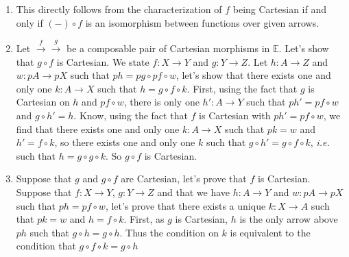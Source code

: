 \documentclass{report}
\newcommand{\bE}[0]{\mathbb E}
\newcommand{\bB}[0]{\mathbb B}
\begin{document}
\begin{answer}
    \begin{enumerate}[label=(\roman*)]
        \item This directly follows from the characterization of $f$ being Cartesian if and only if $(-)\circ
        f$ is an isomorphism between functions over given arrows.
        \item Let $\xrightarrow f \xrightarrow g$ be a composable pair of Cartesian morphisms in $\bE$.
        Let's show that $g\circ f$ is Cartesian. We state $f : X \to Y$ and $g : Y \to Z$. Let
        $h : A \to Z$ and $w : pA \to pX$ such that $ph = pg\circ pf \circ w$, let's show that there exists
        one and only one $k : A \to X$ such that $h = g \circ f \circ k$. First, using the fact that $g$ is
        Cartesian on $h$ and $pf\circ w$, there is only one $h' : A \to Y$ such that $ph' = pf \circ w$ and
        $g\circ h' = h$. Know, using the fact that $f$ is Cartesian with $ph' = pf\circ w$, we find that there
        exists one and only one $k : A \to X$ such that $pk = w$ and $h' = f\circ k$, so there exists one and
        only one $k$ such that $g\circ h' = g\circ f \circ k$, \textit{i.e.} such that $h = g\circ g \circ k$.
        So $g\circ f$ is Cartesian.
        \begin{center}
        \end{center}
        \item Suppose that $g$ and $g\circ f$ are Cartesian, let's prove that $f$ is Cartesian. Suppose that
        $f : X \to Y$, $g : Y \to Z$ and that we have $h : A \to Y$ and $w : pA \to pX$ such that
        $ph = pf \circ w$, let's prove that there exists a unique $k : X \to A$ such that $pk = w$ and
        $h = f\circ k$. First, as $g$ is Cartesian, $h$ is the only arrow above $ph$ such that $g\circ h =
        g\circ h$. Thus the condition on $k$ is equivalent to the condition that $g\circ f\circ k = g\circ h$

\end{enumerate}
\end{answer}
\end{document}
